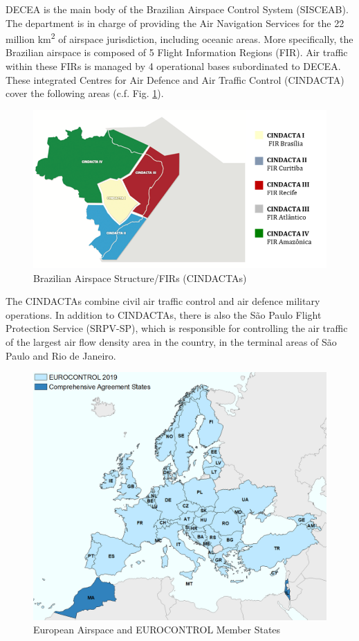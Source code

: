 \documentclass[
]{book}
\begin{document}
DECEA is the main body of the Brazilian Airspace Control System (SISCEAB).
The department is in charge of providing the Air Navigation Services for the 22 million km\textsuperscript{2} of airspace jurisdiction, including oceanic areas.
More specifically, the Brazilian airspace is composed of 5 Flight Information Regions (FIR).
Air traffic within these FIRs is managed by 4 operational bases subordinated to DECEA.
These integrated Centres for Air Defence and Air Traffic Control (CINDACTA) cover the following areas (c.f. Fig. \ref{fig:BRA-FIR}).



\begin{figure}
\includegraphics[width=10.01in]{./figures/Brazil-FIR-CINDACTAs2} \caption{Brazilian Airspace Structure/FIRs (CINDACTAs)}\label{fig:BRA-FIR}
\end{figure}

The CINDACTAs combine civil air traffic control and air defence military operations.
In addition to CINDACTAs, there is also the São Paulo Flight Protection Service (SRPV-SP), which is responsible for controlling the air traffic of the largest air flow density area in the country, in the terminal areas of São Paulo and Rio de Janeiro.



\begin{figure}
\includegraphics[width=17.03in]{./figures/Europe-EUROCONTROL} \caption{European Airspace and EUROCONTROL Member States}\label{fig:Europe-EUROCONTROL}
\end{figure}
\end{document}
